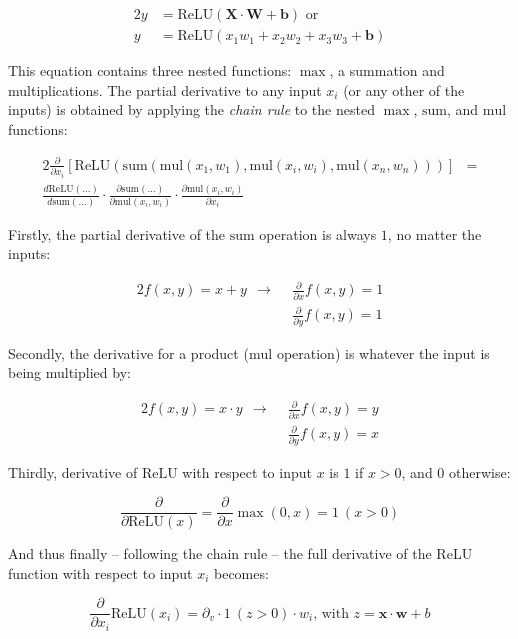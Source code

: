 \documentclass[a4paper]{article}
\newcommand{\matr}[1]{\mathbf{#1}}
\newcommand{\vect}[1]{\bm{#1}}
\newcommand{\mul}{\text{mul}}
\newcommand{\summ}{\text{sum}}
\newcommand{\relu}{\text{ReLU}}
\begin{document}
\begin{alignat*}{2}
    y &= \relu(\matr{X} \cdot \matr{W} + \vect{b}) \text{ or} \\
    y &= \relu(x_1w_1 + x_2w_2 + x_3w_3 + \vect{b})
\end{alignat*}

This equation contains three nested functions: $\max$, a summation and multiplications. The partial derivative to any input $x_i$ (or any other of the inputs) is obtained by applying the \emph{chain rule} to the nested $\max$, $\summ$, and $\mul$ functions:

\begin{alignat*}{2}
    \frac{\partial}{\partial x_i}[\relu(\summ(\mul(x_1,w_1),\mul(x_i,w_i),\mul(x_n,w_n)))] &=\\
    \frac{d\relu(\dots)}{d\summ(\dots)} \cdot \frac{\partial\summ(\dots)}{\partial\mul(x_i,w_i)} \cdot \frac{\partial\mul(x_i,w_i)}{\partial x_i} &
\end{alignat*}

Firstly, the partial derivative of the $\summ$ operation is always $1$, no matter the inputs:

\begin{alignat*}{2}
    f(x,y) = x+y ~~ \rightarrow ~~ &\frac{\partial}{\partial x}f(x,y) = 1 \\
                                   &\frac{\partial}{\partial y}f(x,y) = 1
\end{alignat*}

Secondly, the derivative for a product ($\mul$ operation) is whatever the input is being multiplied by:

\begin{alignat*}{2}
    f(x,y) = x \cdot y ~~ \rightarrow ~~ &\frac{\partial}{\partial x}f(x,y) = y \\
                                         &\frac{\partial}{\partial y}f(x,y) = x
\end{alignat*}

Thirdly, derivative of $\relu$ with respect to input $x$ is $1$ if $x > 0$, and $0$ otherwise:

\begin{equation*}{}
    \frac{\partial}{\partial\relu(x)} = \frac{\partial}{\partial x}\max(0, x) = 1 \: (x > 0)
\end{equation*}

And thus finally -- following the chain rule -- the full derivative of the $\relu$ function with respect to input $x_i$ becomes:

\begin{equation*}{}
    \frac{\partial}{\partial x_i}\relu(x_i) = \partial_v \cdot 1 \: (z > 0) \cdot w_i \text {, with } z = \vect{x} \cdot \vect{w} + b
\end{equation*}
\end{document}
